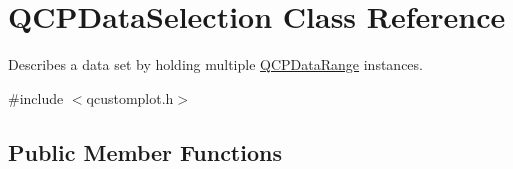\hypertarget{class_q_c_p_data_selection}{}\section{Q\+C\+P\+Data\+Selection Class Reference}
\label{class_q_c_p_data_selection}


Describes a data set by holding multiple \hyperlink{class_q_c_p_data_range}{Q\+C\+P\+Data\+Range} instances.  




{\ttfamily \#include $<$qcustomplot.\+h$>$}

\subsection*{Public Member Functions}
